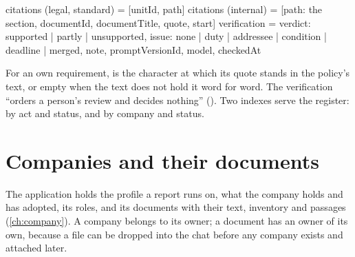 \begin{codeblock}
citations (legal, standard) = [{unitId, path}]
citations (internal)        = [{path: the section, documentId, documentTitle,
                                quote, start}]
verification = {verdict: supported | partly | unsupported,
                issue: none | duty | addressee | condition | deadline | merged,
                note, promptVersionId, model, checkedAt}
\end{codeblock}

For an own requirement,  is the character at which its quote stands in the
policy's text, or empty when the text does not hold it word for word. The verification
\enquote{orders a person's review and decides nothing} (). Two indexes
serve the register: by act and status, and by company and status.

\section{Companies and their documents}\label{sec:data:companies}

The application  holds the profile a report runs on, what the company holds and
has adopted, its roles, and its documents with their text, inventory and passages
(\cref{ch:company}). A company belongs to its owner; a document has an owner of its own, because
a file can be dropped into the chat before any company exists and attached later.

